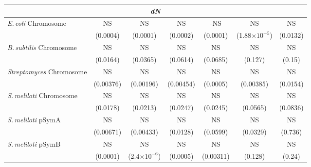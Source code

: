 \documentclass[11pt]{article}
\newcommand{\smel}{\textit{S.\,meliloti}\xspace}
\newcommand{\strep}{\textit{Streptomyces}\xspace}
\newcommand{\ecol}{\textit{E.\,coli}\xspace}
\newcommand{\bass}{\textit{B.\,subtilis}\xspace}
\newcommand{\pa}{pSymA\xspace}
\newcommand{\pb}{pSymB\xspace}
\newcommand{\dn}{\textit{dN}\xspace}
\providecommand{\e}[1]{\ensuremath{\times 10^{#1}}}
\begin{document}
\begin{table}[h]
{\begin{tabular}{lcccccc}
			
			\multicolumn{7}{c}{\textbf{\dn}} \\
			\midrule
			\ecol Chromosome & NS & NS & NS & -NS & NS & NS\\
			& (0.0004)& (0.0001) & (0.0002) & (0.0001) & (1.88\e{-5}) & (0.0132)\\
			\midrule
			\bass Chromosome & NS & NS & NS & NS & NS & NS\\
			& (0.0164) & (0.0365) & (0.0614) & (0.0685) & (0.127) & (0.15)\\
			\midrule
			\strep Chromosome &  NS & NS & NS & NS & NS & NS\\
			& (0.00376)& (0.00196) & (0.00454) & (0.0005) & (0.00385) & (0.0154)\\
			\midrule
			\smel Chromosome &  NS & NS & NS & NS & NS & NS\\
			& (0.0178) & (0.0213) & (0.0247) &(0.0245) & (0.0565) & (0.0836)\\
			\midrule
			\smel \pa &  NS & NS & NS & NS & NS & NS\\
			& (0.00671) & (0.00433) & (0.0128) & (0.0599) & (0.0329) & (0.736)\\
			\midrule
			\smel \pb &  NS & NS & NS & NS & NS & NS\\
			& (0.0001) & (2.4\e{-6}) & (0.0005) & (0.00311) & (0.128) & (0.24)\\
			\midrule


\end{tabular}}
\end{table}
\end{document}
